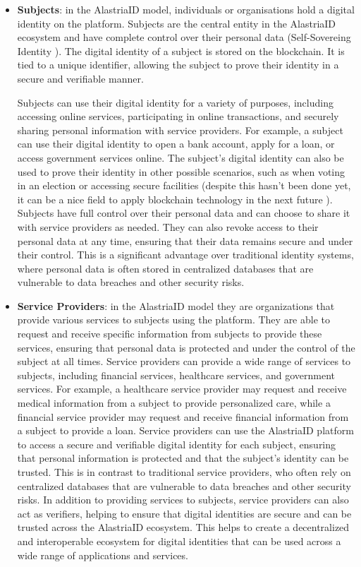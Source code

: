 \documentclass[target=mst,aauheader=]{thud}
\begin{document}
\begin{itemize}

    \item \textbf{Subjects}: in the AlastriaID model, individuals or organisations hold a digital identity on the platform. Subjects are the central entity in the AlastriaID ecosystem and have complete control over their personal data (Self-Sovereing Identity \cite{selfSovereignIdentity}). The digital identity of a subject is stored on the blockchain. It is tied to a unique identifier, allowing the subject to prove their identity in a secure and verifiable manner.\par
        Subjects can use their digital identity for a variety of purposes, including accessing online services, participating in online transactions, and securely sharing personal information with service providers. For example, a subject can use their digital identity to open a bank account, apply for a loan, or access government services online. The subject's digital identity can also be used to prove their identity in other possible scenarios, such as when voting in an election or accessing secure facilities (despite this hasn't been done yet, it can be a nice field to apply blockchain technology in the next future \cite{blockchainVotingSystem}).
        Subjects have full control over their personal data and can choose to share it with service providers as needed. They can also revoke access to their personal data at any time, ensuring that their data remains secure and under their control. This is a significant advantage over traditional identity systems, where personal data is often stored in centralized databases that are vulnerable to data breaches and other security risks.

    \item \textbf{Service Providers}: in the AlastriaID model they are organizations that provide various services to subjects using the platform. They are able to request and receive specific information from subjects to provide these services, ensuring that personal data is protected and under the control of the subject at all times. Service providers can provide a wide range of services to subjects, including financial services, healthcare services, and government services. For example, a healthcare service provider may request and receive medical information from a subject to provide personalized care, while a financial service provider may request and receive financial information from a subject to provide a loan.
        Service providers can use the AlastriaID platform to access a secure and verifiable digital identity for each subject, ensuring that personal information is protected and that the subject's identity can be trusted. This is in contrast to traditional service providers, who often rely on centralized databases that are vulnerable to data breaches and other security risks.
        In addition to providing services to subjects, service providers can also act as verifiers, helping to ensure that digital identities are secure and can be trusted across the AlastriaID ecosystem. This helps to create a decentralized and interoperable ecosystem for digital identities that can be used across a wide range of applications and services.


\end{itemize}
\end{document}
